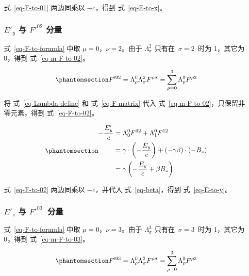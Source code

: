 \documentclass[
  chinese,
  a4paper,
  UTF8,
  12pt,
  oneside,
  openany]{ctexbook}
\theoremstyle{plain}
\theoremstyle{plain}
\theoremstyle{plain}
\theoremstyle{definition}
\theoremstyle{plain}
\theoremstyle{plain}
\theoremstyle{remark}
\begin{document}
式~\ref{eq-F-to-01} 两边同乘以 \(-c\)，得到 式~\ref{eq-E-to-x}。

\subsubsection{\texorpdfstring{\(E'_y\) 与 \(F'^{02}\)
分量}{E\textquotesingle\_y 与 F\textquotesingle\^{}\{02\} 分量}}\label{e_y-ux4e0e-f02-ux5206ux91cf}

式~\ref{eq-F-to-formula} 中取 \(\mu = 0\)，\(\nu = 2\)。由于
\(\Lambda_{\sigma}^{2}\) 只有在~\(\sigma = 2\)~时为 1，其它为 0，得到
式~\ref{eq-m-F-to-02}。

\begin{equation}\protect\phantomsection\label{eq-m-F-to-02}{
F'^{02} = \Lambda_{\rho}^{0}\Lambda_{\sigma}^{2}F^{\rho\sigma}
= \sum_{\rho = 0}^{3}\Lambda_{\rho}^{0}F^{\rho 2}
}\end{equation}

将 式~\ref{eq-Lambda-define} 和 式~\ref{eq-F-matrix} 代入
式~\ref{eq-m-F-to-02}，只保留非零元素，得到 式~\ref{eq-F-to-02}。

\begin{equation}\protect\phantomsection\label{eq-F-to-02}{
\begin{aligned}
-\frac{E'_y}{c} &= \Lambda_{0}^{0} F^{02} + \Lambda_{1}^{0} F^{12} \\
 &= \gamma \cdot \left(-\frac{E_y}{c} \right) + (-\gamma\beta) \cdot (- B_z ) \\
 &= \gamma \left(- \frac{E_y}{c} + \beta B_z \right)
\end{aligned}
}\end{equation}

式~\ref{eq-F-to-02} 两边同乘以 \(-c\)，并代入 式~\ref{eq-beta}，得到
式~\ref{eq-E-to-y}。

\subsubsection{\texorpdfstring{\(E'_z\) 与
\(F'^{03}\)~分量}{E\textquotesingle\_z 与 F\textquotesingle\^{}\{03\}~分量}}\label{e_z-ux4e0e-f03-ux5206ux91cf}

式~\ref{eq-F-to-formula} 中取 \(\mu = 0\)，\(\nu = 3\)。由于
\(\Lambda_{\sigma}^{3}\) 只有在~\(\sigma = 3\)~时为 1，其它为 0，得到
式~\ref{eq-m-F-to-03}。

\begin{equation}\protect\phantomsection\label{eq-m-F-to-03}{
F'^{03} = \Lambda_{\rho}^{0}\Lambda_{\sigma}^{3}F^{\rho\sigma}
= \sum_{\rho = 0}^{3}\Lambda_{\rho}^{0}F^{\rho 3}
}\end{equation}
\end{document}
